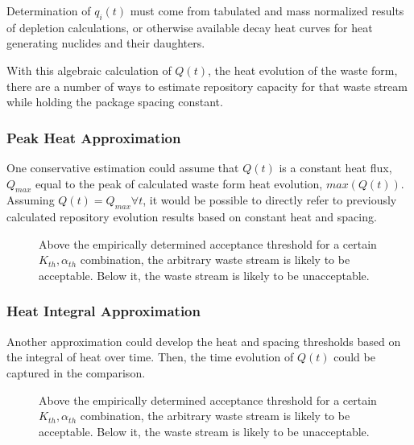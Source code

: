 \documentclass[letterpaper]{article}
\begin{document}
Determination of $q_i(t)$ must come from tabulated and mass normalized results 
of depletion calculations, or otherwise available decay heat curves for heat 
generating nuclides and their daughters.

With this algebraic calculation of $Q(t)$, the heat evolution of the waste form, 
there are a number of ways to estimate repository capacity for that waste stream 
while holding the package spacing constant. 

\subsubsection{Peak Heat Approximation}

One conservative estimation could assume that $Q(t)$ is a constant heat flux, 
$Q_{max}$ equal to the peak of calculated waste form heat evolution, 
$max(Q(t))$. Assuming $Q(t) = Q_{max} \forall t$, it would be possible to 
directly refer to previously calculated repository evolution results 
based on constant heat and spacing. 

\begin{figure}[htb!]
  \begin{center}
    \def\svgwidth{.7\textwidth}
    
  \end{center}
  \caption{Above the empirically determined acceptance threshold for a certain 
  $K_{th}, \alpha_{th}$ combination, the arbitrary  waste stream is likely to be 
  acceptable. Below it, the waste stream is likely to be unacceptable. }
  \label{fig:acceptance}
\end{figure}

\subsubsection{Heat Integral Approximation}

Another approximation could develop the heat and spacing thresholds based on the 
integral of heat over time. Then, the time evolution of $Q(t)$ could be captured  
in the comparison. 

\begin{figure}[htb!]
  \begin{center}
    \def\svgwidth{.7\textwidth}
    
  \end{center}
  \caption{Above the empirically determined acceptance threshold for a certain 
  $K_{th}, \alpha_{th}$ combination, the arbitrary  waste stream is likely to be 
  acceptable. Below it, the waste stream is likely to be unacceptable. }
  \label{fig:acceptanceInt}
\end{figure}
\end{document}
